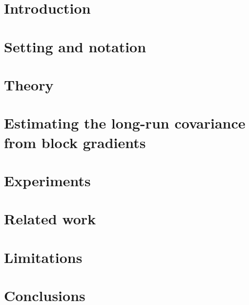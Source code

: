 
\section{Introduction}
\label{sec:intro}


\section{Setting and notation}
\label{sec:setting}


\section{Theory}
\label{sec:theory}


\section{Estimating the long-run covariance from block gradients}
\label{sec:lrv}


\section{Experiments}
\label{sec:exp}







\section{Related work}
\label{sec:related}


\section{Limitations}
\label{sec:limits}


\section{Conclusions}
\label{sec:conclusions}


